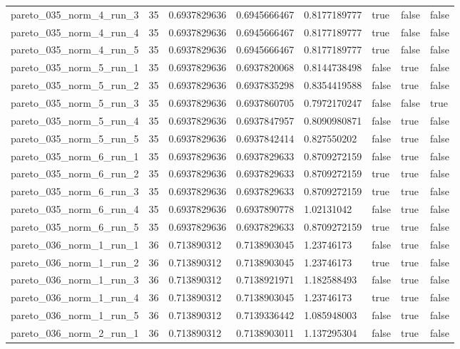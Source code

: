 \begin{tabular}{@{}llllllll@{}}
pareto\_035\_norm\_4\_run\_3 & 35 & 0.6937829636 & 0.6945666467 & 0.8177189777 & true & false & false \\
pareto\_035\_norm\_4\_run\_4 & 35 & 0.6937829636 & 0.6945666467 & 0.8177189777 & true & false & false \\
pareto\_035\_norm\_4\_run\_5 & 35 & 0.6937829636 & 0.6945666467 & 0.8177189777 & true & false & false \\
pareto\_035\_norm\_5\_run\_1 & 35 & 0.6937829636 & 0.6937820068 & 0.8144738498 & false & true & false \\
pareto\_035\_norm\_5\_run\_2 & 35 & 0.6937829636 & 0.6937835298 & 0.8354419588 & false & true & false \\
pareto\_035\_norm\_5\_run\_3 & 35 & 0.6937829636 & 0.6937860705 & 0.7972170247 & false & false & true \\
pareto\_035\_norm\_5\_run\_4 & 35 & 0.6937829636 & 0.6937847957 & 0.8090980871 & false & true & false \\
pareto\_035\_norm\_5\_run\_5 & 35 & 0.6937829636 & 0.6937842414 & 0.827550202 & false & true & false \\
pareto\_035\_norm\_6\_run\_1 & 35 & 0.6937829636 & 0.6937829633 & 0.8709272159 & false & true & false \\
pareto\_035\_norm\_6\_run\_2 & 35 & 0.6937829636 & 0.6937829633 & 0.8709272159 & true & true & false \\
pareto\_035\_norm\_6\_run\_3 & 35 & 0.6937829636 & 0.6937829633 & 0.8709272159 & true & true & false \\
pareto\_035\_norm\_6\_run\_4 & 35 & 0.6937829636 & 0.6937890778 & 1.02131042 & false & true & false \\
pareto\_035\_norm\_6\_run\_5 & 35 & 0.6937829636 & 0.6937829633 & 0.8709272159 & true & true & false \\
pareto\_036\_norm\_1\_run\_1 & 36 & 0.713890312 & 0.7138903045 & 1.23746173 & false & true & false \\
pareto\_036\_norm\_1\_run\_2 & 36 & 0.713890312 & 0.7138903045 & 1.23746173 & true & true & false \\
pareto\_036\_norm\_1\_run\_3 & 36 & 0.713890312 & 0.7138921971 & 1.182588493 & false & true & false \\
pareto\_036\_norm\_1\_run\_4 & 36 & 0.713890312 & 0.7138903045 & 1.23746173 & true & true & false \\
pareto\_036\_norm\_1\_run\_5 & 36 & 0.713890312 & 0.7139336442 & 1.085948003 & false & true & false \\
pareto\_036\_norm\_2\_run\_1 & 36 & 0.713890312 & 0.7138903011 & 1.137295304 & false & true & false \\

\end{tabular}
